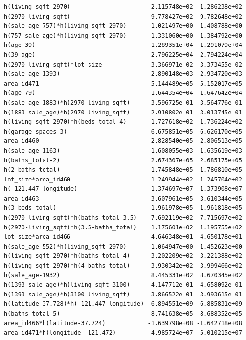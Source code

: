 \documentclass[
]{article}
\begin{document}
\begin{verbatim}
h(living_sqft-2970)                       2.115748e+02  1.286238e+02
h(2970-living_sqft)                      -9.778427e+02 -9.782648e+02
h(sale_age-757)*h(living_sqft-2970)      -1.021497e+00 -1.408788e+00
h(757-sale_age)*h(living_sqft-2970)       1.331060e+00  1.384792e+00
h(age-39)                                 1.289351e+04  1.291079e+04
h(39-age)                                 2.796225e+04  2.794224e+04
h(2970-living_sqft)*lot_size              3.366971e-02  3.373455e-02
h(sale_age-1393)                         -2.890148e+03 -2.934720e+03
area_id471                               -5.144489e+05 -5.152017e+05
h(age-79)                                -1.644354e+04 -1.647642e+04
h(sale_age-1883)*h(2970-living_sqft)      3.596725e-01  3.564776e-01
h(1883-sale_age)*h(2970-living_sqft)     -2.910802e-01 -3.013745e-01
h(living_sqft-2970)*h(beds_total-4)      -1.727618e+02 -1.736224e+02
h(garage_spaces-3)                       -6.675851e+05 -6.626170e+05
area_id460                               -2.828540e+05 -2.806513e+05
h(sale_age-1163)                          1.608055e+03  1.635619e+03
h(baths_total-2)                          2.674307e+05  2.685175e+05
h(2-baths_total)                         -1.745848e+05 -1.786810e+05
lot_size*area_id460                       1.249944e+02  1.245704e+02
h(-121.447-longitude)                     1.374697e+07  1.373908e+07
area_id463                                3.607961e+05  3.610344e+05
h(3-beds_total)                          -1.961978e+05 -1.961818e+05
h(2970-living_sqft)*h(baths_total-3.5)   -7.692119e+02 -7.715697e+02
h(2970-living_sqft)*h(3.5-baths_total)    1.175601e+02  1.195755e+02
lot_size*area_id466                       4.646348e+01  4.650178e+01
h(sale_age-552)*h(living_sqft-2970)       1.064947e+00  1.452623e+00
h(living_sqft-2970)*h(baths_total-4)      3.202209e+02  3.221388e+02
h(living_sqft-2970)*h(4-baths_total)      3.930342e+02  3.999466e+02
h(sale_age-1932)                          8.445331e+02  8.670345e+02
h(1393-sale_age)*h(living_sqft-3100)      4.147712e-01  4.658092e-01
h(1393-sale_age)*h(3100-living_sqft)      3.866522e-01  3.993615e-01
h(latitude-37.728)*h(-121.447-longitude) -6.894551e+09 -6.885831e+09
h(baths_total-5)                         -8.741638e+05 -8.688352e+05
area_id466*h(latitude-37.724)            -1.639798e+08 -1.642718e+08
area_id471*h(longitude--121.472)          4.985724e+07  5.010215e+07
                                                                    

\end{verbatim}
\end{document}
